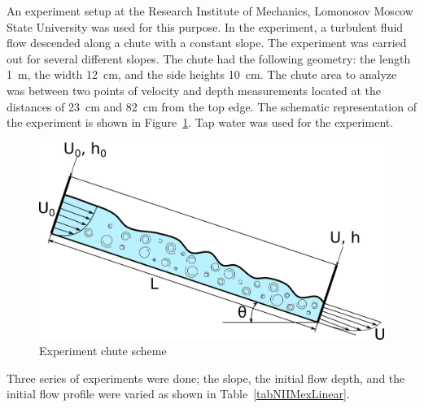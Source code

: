 \documentclass[sensors,article,submit,moreauthors,pdftex]{Definitions/mdpi}
\begin{document}
An experiment setup at the Research Institute of Mechanics, Lomonosov Moscow State University was used for this purpose. In the experiment, a turbulent fluid flow descended along a chute with a constant slope. The experiment was carried out for several different slopes. The chute had the following geometry: the length 1~m, the width 12~cm, and the side heights 10~cm. The chute area to analyze was between two points of velocity and depth measurements located at the distances of 23~cm and 82~cm from the top edge. The schematic representation of the experiment is shown in Figure~\ref{NIIMexLinearUProfileInlet}. Tap water was used for the experiment.

\begin{figure}[H]	
\widefigure
\includegraphics[width=10 cm]{NIIMexLinearUProfileInlet.png}
\caption{Experiment chute scheme\label{NIIMexLinearUProfileInlet}}
\end{figure}

Three series of experiments were done; the slope, the initial flow depth, and the initial flow profile were varied as shown in Table~\ref{tabNIIMexLinear}.
\end{document}
